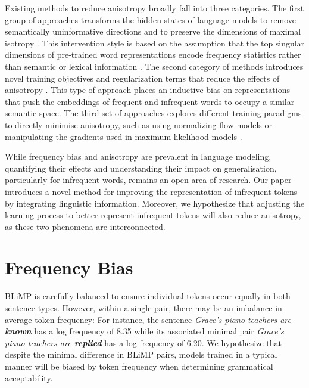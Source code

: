 Existing methods to reduce anisotropy broadly fall into three categories. The first group of approaches transforms the hidden states of language models to remove semantically uninformative directions and to preserve the dimensions of maximal isotropy \citep{arora2016simple, mu2018all, raunak2019effective, su2021whitening,bis2021too}. This intervention style is based on the assumption that the top singular dimensions of pre-trained word representations encode frequency statistics rather than semantic or lexical information \citep{mu2018all}. The second category of methods introduces novel training objectives and regularization terms that reduce the effects of anisotropy \citep{gong2018frage, gao2018representation, wang2019improving}. This type of approach places an inductive bias on representations that push the embeddings of frequent and infrequent words to occupy a similar semantic space. The third set of approaches explores different training paradigms to directly minimise anisotropy, such as using normalizing flow models \citep{li2020sentence} or manipulating the gradients used in maximum likelihood models \citep{yu2022rare}.

\vspace{1em}

While frequency bias and anisotropy are prevalent in language modeling, quantifying their effects and understanding their impact on generalisation, particularly for infrequent words, remains an open area of research. Our paper introduces a novel method for improving the representation of infrequent tokens by integrating linguistic information. Moreover, we hypothesize that adjusting the learning process to better represent infrequent tokens will also reduce anisotropy, as these two phenomena are interconnected.

\section{Frequency Bias}
\label{sec:freq-bias}

BLiMP is carefully balanced to ensure individual tokens occur equally in both sentence types. However, within a single pair, there may be an imbalance in average token frequency: For instance, the sentence
\textit{Grace's piano teachers are \textbf{known}} has a log frequency of 8.35 while its associated minimal pair \textit{Grace's piano teachers are \textbf{replied}} has a log frequency of 6.20.  We hypothesize that despite the minimal difference in BLiMP pairs, models trained in a typical manner will be biased by token frequency when determining grammatical acceptability.

